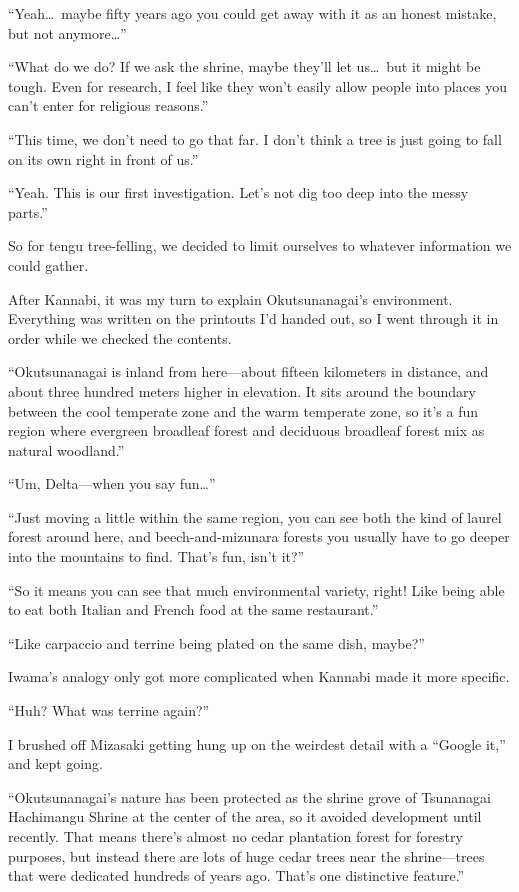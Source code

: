 \documentclass[
    a4paper,
    12pt,
    twoside,
    openany,
    UTF8,
    fontset=windows
]{ctexbook}
\begin{document}
``Yeah\dots\ maybe fifty years ago you could get away with it as an honest mistake, but not anymore\dots''

``What do we do? If we ask the shrine, maybe they'll let us\dots\ but it might be tough. Even for research, I feel like they won't easily allow people into places you can't enter for religious reasons.''

``This time, we don't need to go that far. I don't think a tree is just going to fall on its own right in front of us.''

``Yeah. This is our first investigation. Let's not dig too deep into the messy parts.''

So for tengu tree-felling, we decided to limit ourselves to whatever information we could gather.

After Kannabi, it was my turn to explain Okutsunanagai's environment. Everything was written on the printouts I'd handed out, so I went through it in order while we checked the contents.

``Okutsunanagai is inland from here---about fifteen kilometers in distance, and about three hundred meters higher in elevation. It sits around the boundary between the cool temperate zone and the warm temperate zone, so it's a fun region where evergreen broadleaf forest and deciduous broadleaf forest mix as natural woodland.''

``Um, Delta---when you say fun\dots''

``Just moving a little within the same region, you can see both the kind of laurel forest around here, and beech-and-mizunara forests you usually have to go deeper into the mountains to find. That's fun, isn't it?''

``So it means you can see that much environmental variety, right! Like being able to eat both Italian and French food at the same restaurant.''

``Like carpaccio and terrine being plated on the same dish, maybe?''

Iwama's analogy only got more complicated when Kannabi made it more specific.

``Huh? What was terrine again?''

I brushed off Mizasaki getting hung up on the weirdest detail with a ``Google it,'' and kept going.

``Okutsunanagai's nature has been protected as the shrine grove of Tsunanagai Hachimangu Shrine at the center of the area, so it avoided development until recently. That means there's almost no cedar plantation forest for forestry purposes, but instead there are lots of huge cedar trees near the shrine---trees that were dedicated hundreds of years ago. That's one distinctive feature.''
\end{document}
